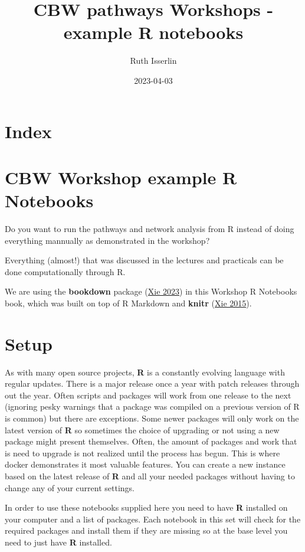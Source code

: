 \documentclass[
]{book}
\title{CBW pathways Workshops - example R notebooks}
\author{Ruth Isserlin}
\date{2023-04-03}
\begin{document}
\maketitle

{
\setcounter{tocdepth}{1}
\tableofcontents
}
\hypertarget{index}{%
\chapter{Index}\label{index}}

\hypertarget{intro}{%
\chapter{CBW Workshop example R Notebooks}\label{intro}}

Do you want to run the pathways and network analysis from R instead of doing everything mannually as demonstrated in the workshop?

Everything (almost!) that was discussed in the lectures and practicals can be done computationally through R.

We are using the \textbf{bookdown} package (\protect\hyperlink{ref-R-bookdown}{Xie 2023}) in this Workshop R Notebooks book, which was built on top of R Markdown and \textbf{knitr} (\protect\hyperlink{ref-xie2015}{Xie 2015}).

\hypertarget{setup}{%
\chapter{Setup}\label{setup}}

As with many open source projects, \textbf{R} is a constantly evolving language with regular updates. There is a major release once a year with patch releases through out the year. Often scripts and packages will work from one release to the next (ignoring pesky warnings that a package was compiled on a previous version of R is common) but there are exceptions. Some newer packages will only work on the latest version of \textbf{R} so sometimes the choice of upgrading or not using a new package might present themselves. Often, the amount of packages and work that is need to upgrade is not realized until the process has begun. This is where docker demonstrates it most valuable features. You can create a new instance based on the latest release of \textbf{R} and all your needed packages without having to change any of your current settings.

In order to use these notebooks supplied here you need to have \textbf{R} installed on your computer and a list of packages. Each notebook in this set will check for the required packages and install them if they are missing so at the base level you need to just have \textbf{R} installed.
\end{document}
